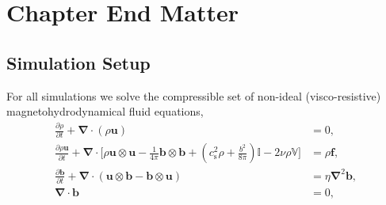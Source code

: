 \documentclass[12pt,twoside]{extreport}
\newcommand{\rbrac}[1]{\left( #1 \right)} %
\newcommand{\mVector}[1]{\bm{#1}} %
\newcommand{\mTensor}[1]{\mathbb{#1}} %
\newcommand{\mpp}[1]{\partial #1}
\newcommand{\mppFrac}[2]{\frac{\mpp{#1}}{\mpp{#2}}}
\newcommand{\nquad}[1][1]{\hspace*{#1em}\ignorespaces}
\providecommand{\DIFaddbegin}{} %
\providecommand{\DIFaddend}{} %
\providecommand{\DIFdelbegin}{} %
\providecommand{\DIFdelend}{} %
\providecommand{\DIFscaledelfig}{0.5}
\newlength{\DIFdelgraphicswidth} %
\newlength{\DIFdelgraphicsheight} %
\providecommand{\DIFaddincludegraphics}[2][]{{\color{DIFgreen}\fbox{\DIFOincludegraphics[#1]{#2}}}} %
\providecommand{\DIFdelincludegraphics}[2][]{%
\sbox{\DIFdelgraphicsbox}{\DIFOincludegraphics[#1]{#2}}%
\settoboxwidth{\DIFdelgraphicswidth}{\DIFdelgraphicsbox} %
\settoboxtotalheight{\DIFdelgraphicsheight}{\DIFdelgraphicsbox} %
\scalebox{\DIFscaledelfig}{%
\parbox[b]{\DIFdelgraphicswidth}{\usebox{\DIFdelgraphicsbox}\\[-\baselineskip] \rule{\DIFdelgraphicswidth}{0em}}\llap{\resizebox{\DIFdelgraphicswidth}{\DIFdelgraphicsheight}{%
\setlength{\unitlength}{\DIFdelgraphicswidth}%
\begin{picture}(1,1)%
\thicklines\linethickness{2pt} %
{\color{DIFpurple}\put(0,0){\framebox(1,1){}}}%
{\color{DIFpurple}\put(0,0){\line( 1,1){1}}}%
{\color{DIFpurple}\put(0,1){\line(1,-1){1}}}%
\end{picture}%
}\hspace*{3pt}}} %
} %
\DeclareRobustCommand{\DIFaddbegin}{\DIFOaddbegin \let\includegraphics\DIFaddincludegraphics} %
\DeclareRobustCommand{\DIFaddend}{\DIFOaddend \let\includegraphics\DIFOincludegraphics} %
\DeclareRobustCommand{\DIFdelbegin}{\DIFOdelbegin \let\includegraphics\DIFdelincludegraphics} %
\DeclareRobustCommand{\DIFdelend}{\DIFOaddend \let\includegraphics\DIFOincludegraphics} %
\begin{document}
\section{Chapter End Matter}

\subsection{Simulation Setup}
\DIFaddbegin \label{app:ssd-nl:simulation-setup}
\DIFaddend

    For all simulations we solve the compressible set of non-ideal (visco-resistive) magnetohydrodynamical fluid equations,
    \DIFdelbegin %
\DIFdelend \DIFaddbegin \begin{align}
        \mppFrac{\rho}{t}
            + \mVector{\nabla}\cdot(\rho \mVector{u})
            &= 0
            , \\
        \mppFrac{\rho\mVector{u}}{t}
            + \mVector{\nabla}\cdot\bigg[
                \rho\mVector{u}\otimes\mVector{u}
                - \frac{1}{4\pi}\mVector{b}\otimes\mVector{b}
                + \rbrac{c_\mathrm{s}^2\rho + \frac{b^2}{8\pi}} \mTensor{I}
                - 2\nu\rho \mTensor{V}
            \bigg] &= \rho\mVector{f}
            , \\
        \mppFrac{\mVector{b}}{t}
            + \mVector{\nabla}\cdot\rbrac{\mVector{u}\otimes\mVector{b}-\mVector{b}\otimes\mVector{u}}
            &= \eta \mVector{\nabla}^2\mVector{b}
            , \\
        \mVector{\nabla}\cdot\mVector{b}
            &= 0
            ,
    \end{align}\DIFaddend
\end{document}
